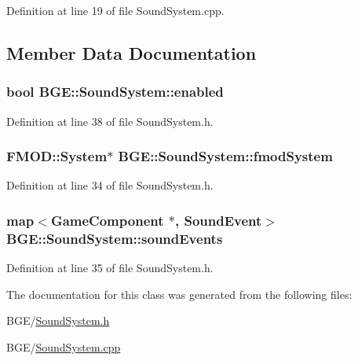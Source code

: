 Definition at line 19 of file Sound\-System.\-cpp.



\subsection{Member Data Documentation}
\hypertarget{class_b_g_e_1_1_sound_system_aedde6ce3440f1ccc85e43461cce75f27}{
\subsubsection[{enabled}]{\setlength{\rightskip}{0pt plus 5cm}bool B\-G\-E\-::\-Sound\-System\-::enabled}}\label{class_b_g_e_1_1_sound_system_aedde6ce3440f1ccc85e43461cce75f27}


Definition at line 38 of file Sound\-System.\-h.

\hypertarget{class_b_g_e_1_1_sound_system_a28ab640f1afd14293ee5849f49cc31c4}{
\subsubsection[{fmod\-System}]{\setlength{\rightskip}{0pt plus 5cm}F\-M\-O\-D\-::\-System$\ast$ B\-G\-E\-::\-Sound\-System\-::fmod\-System}}\label{class_b_g_e_1_1_sound_system_a28ab640f1afd14293ee5849f49cc31c4}


Definition at line 34 of file Sound\-System.\-h.

\hypertarget{class_b_g_e_1_1_sound_system_ab789315a3e959dcbdf57d742145d8f45}{
\subsubsection[{sound\-Events}]{\setlength{\rightskip}{0pt plus 5cm}map$<${\bf Game\-Component} $\ast$, {\bf Sound\-Event}$>$ B\-G\-E\-::\-Sound\-System\-::sound\-Events}}\label{class_b_g_e_1_1_sound_system_ab789315a3e959dcbdf57d742145d8f45}


Definition at line 35 of file Sound\-System.\-h.



The documentation for this class was generated from the following files\-:\begin{DoxyCompactItemize}
\item 
B\-G\-E/\hyperlink{_sound_system_8h}{Sound\-System.\-h}\item 
B\-G\-E/\hyperlink{_sound_system_8cpp}{Sound\-System.\-cpp}\end{DoxyCompactItemize}
